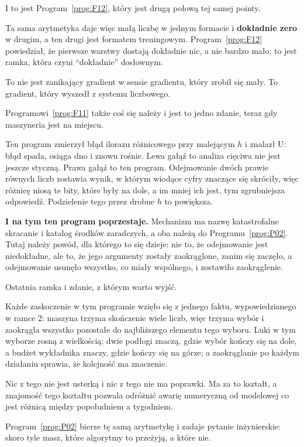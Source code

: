 \begin{fr}

I to jest Program~\ref{prog:F12}, który jest drugą połową tej samej pointy.

Ta sama arytmetyka daje więc małą liczbę w jednym formacie i \textbf{dokładnie
zero} w drugim, a ten drugi jest formatem treningowym.
Program~\ref{prog:F12} powiedział, że pierwsze warstwy dostają dokładnie nic, a
nie bardzo mało; to jest ramka, która czyni \enquote{dokładnie} dosłownym.

To nie jest zanikający gradient w sensie gradientu, który zrobił się mały. To
gradient, który wyszedł z systemu liczbowego.
\end{fr}

\begin{fr}
Programowi~\ref{prog:F11} także coś się należy i jest to jedno zdanie, teraz
gdy maszyneria jest na miejscu.

Ten program zmierzył błąd ilorazu różnicowego przy malejącym $h$ i znalazł U:
błąd spada, osiąga dno i znowu rośnie. Lewa gałąź to analiza \dash{} cięciwa
nie jest jeszcze styczną. Prawa gałąź to ten program. Odejmowanie dwóch
prawie równych liczb zostawia wynik, w którym wiodące cyfry znaczące się
skróciły, więc różnicę niosą te bity, które były na dole, a im mniej ich jest,
tym zgrubniejsza odpowiedź. Podzielenie tego przez drobne $h$ to powiększa.

\begin{rigourbox}
\textbf{I na tym ten program poprzestaje.} Mechanizm ma nazwę \dash{} katastrofalne
skracanie \dash{} i katalog środków zaradczych, a oba należą do
Programu~\ref{prog:P02}. Tutaj należy powód, dla którego to się dzieje: nie
to, że odejmowanie jest niedokładne, ale to, że jego argumenty zostały
zaokrąglone, zanim się zaczęło, a odejmowanie usunęło wszystko, co miały
wspólnego, i zostawiło zaokrąglenie.
\end{rigourbox}
\end{fr}

\begin{fr}
Ostatnia ramka i zdanie, z którym warto wyjść.

Każde zaskoczenie w tym programie wzięło się z jednego faktu, wypowiedzianego
w ramce 2: maszyna trzyma skończenie wiele liczb, więc trzyma wybór i
zaokrągla wszystko pozostałe do najbliższego elementu tego wyboru. Luki w tym
wyborze rosną z wielkością; dwie podłogi znaczą, gdzie wybór kończy się na
dole, a budżet wykładnika znaczy, gdzie kończy się na górze; a zaokrąglanie po
każdym działaniu sprawia, że kolejność ma znaczenie.

Nic z tego nie jest usterką i nic z tego nie ma poprawki. Ma za to kształt, a
znajomość tego kształtu pozwala odróżnić awarię numeryczną od modelowej
\dash{} co jest różnicą między popołudniem a tygodniem.

Program~\ref{prog:P02} bierze tę samą arytmetykę i zadaje pytanie
inżynierskie: skoro tyle masz, które algorytmy to przeżyją, a które nie.
\end{fr}

